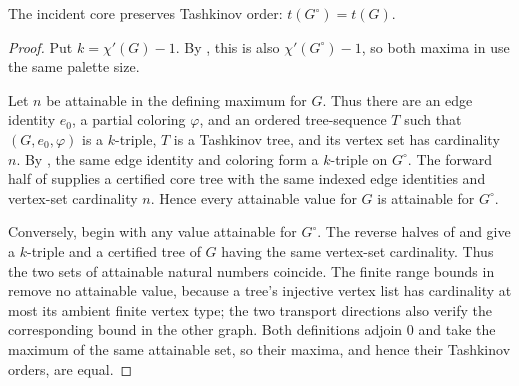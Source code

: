 \begin{lemma}
The incident core preserves Tashkinov order:
$t(G^{\circ})=t(G)$.
\end{lemma}
\begin{proof}
Put $k=\chi'(G)-1$.  By
, this is also
$\chi'(G^{\circ})-1$, so both maxima in  use the
same palette size.

Let $n$ be attainable in the defining maximum for $G$.  Thus there are an
edge identity $e_0$, a partial coloring $\varphi$, and an ordered
tree-sequence $T$ such that $(G,e_0,\varphi)$ is a $k$-triple, $T$ is a
Tashkinov tree, and its vertex set has cardinality $n$.
By , the same edge identity and coloring form a
$k$-triple on $G^{\circ}$.  The forward half of
 supplies a certified core tree with the
same indexed edge identities and vertex-set cardinality $n$.  Hence every
attainable value for $G$ is attainable for $G^{\circ}$.

Conversely, begin with any value attainable for $G^{\circ}$.  The reverse
halves of  and
 give a $k$-triple and a certified tree
of $G$ having the same vertex-set cardinality.  Thus the two sets of
attainable natural numbers coincide.  The finite range bounds in
 remove no attainable value, because a tree's
injective vertex list has cardinality at most its ambient finite vertex
type; the two transport directions also verify the corresponding bound in
the other graph.  Both definitions adjoin $0$ and take the maximum of the
same attainable set, so their maxima, and hence their Tashkinov orders, are
equal.
\end{proof}
